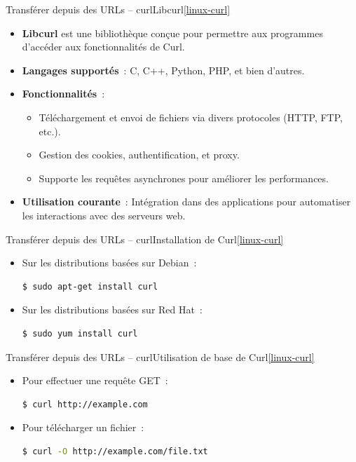\documentclass{beamer}
\begin{document}
    \begin{frame}[fragile]{Transférer depuis des URLs – curl}{Libcurl\cref{linux-curl}}
        \begin{itemize}
            \item \textbf{Libcurl} est une bibliothèque conçue pour permettre aux programmes d'accéder aux fonctionnalités de Curl.
            \item \textbf{Langages supportés}~: C, C++, Python, PHP, et bien d'autres.
            \item \textbf{Fonctionnalités}~:
            \begin{itemize}
                \item Téléchargement et envoi de fichiers via divers protocoles (HTTP, FTP, etc.).
                \item Gestion des cookies, authentification, et proxy.
                \item Supporte les requêtes asynchrones pour améliorer les performances.
            \end{itemize}
            \item \textbf{Utilisation courante}~: Intégration dans des applications pour automatiser les interactions avec des serveurs web.
        \end{itemize}
    \end{frame}

    \begin{frame}[fragile]{Transférer depuis des URLs – curl}{Installation de Curl\cref{linux-curl}}
        \begin{itemize}
            \item Sur les distributions basées sur Debian~:
            \begin{lstlisting}[language=bash]
$ sudo apt-get install curl
            \end{lstlisting}
            \item Sur les distributions basées sur Red Hat~:
            \begin{lstlisting}[language=bash]
$ sudo yum install curl
            \end{lstlisting}
        \end{itemize}
    \end{frame}

    \begin{frame}[fragile]{Transférer depuis des URLs – curl}{Utilisation de base de Curl\cref{linux-curl}}
        \begin{itemize}
            \item Pour effectuer une requête GET~:
            \begin{lstlisting}[language=bash]
$ curl http://example.com
            \end{lstlisting}
            \item Pour télécharger un fichier~:
            \begin{lstlisting}[language=bash]
$ curl -O http://example.com/file.txt
            \end{lstlisting}
        \end{itemize}
    \end{frame}
\end{document}
